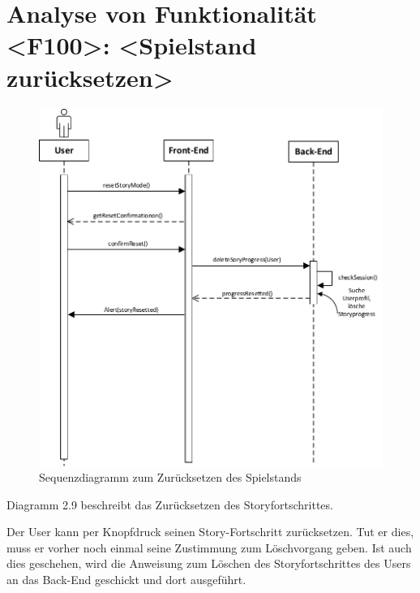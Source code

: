 \section{Analyse von Funktionalität <F100>: <Spielstand zurücksetzen>}
\begin{figure}[h]
\centering
\includegraphics[width=1.3\textwidth]{figures/sequenz_F100.pdf}
\caption{Sequenzdiagramm zum Zurücksetzen des Spielstands}
\label{sequence}
\end{figure}
Diagramm 2.9 beschreibt das Zurücksetzen des Storyfortschrittes.

Der User kann per Knopfdruck seinen Story-Fortschritt zurücksetzen. Tut er dies, muss er vorher noch einmal seine Zustimmung zum Löschvorgang geben. Ist auch dies geschehen, wird die Anweisung zum Löschen des Storyfortschrittes des Users an das Back-End geschickt und dort ausgeführt.

\newpage
